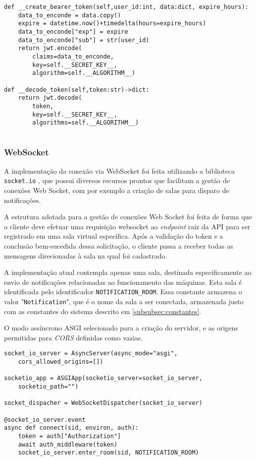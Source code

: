 \begin{verbatim}
def __create_bearer_token(self,user_id:int, data:dict, expire_hours):
    data_to_enconde = data.copy()
    expire = datetime.now()+timedelta(hours=expire_hours)
    data_to_enconde["exp"] = expire
    data_to_enconde["sub"] = str(user_id)
    return jwt.encode(
        claims=data_to_enconde,
        key=self.__SECRET_KEY__,
        algorithm=self.__ALGORITHM__)

def __decode_token(self,token:str)->dict:
    return jwt.decode(
        token,
        key=self.__SECRET_KEY__,
        algorithms=self.__ALGORITHM__)
    
\end{verbatim}

\subsubsection{WebSocket}\label{subsubsec:WebSocketImplement}
A implementação da conexão via WebSocket foi feita utilizando a biblioteca \texttt{socket.io} \cite{socketIoDocs}, que possui diversos recursos prontos que facilitam a gestão de conexões Web Socket, com por exemplo a criação de salas para disparo de notificações.

A estrutura adotada para a gestão de conexões Web Socket foi feita de forma que o cliente deve efetuar uma requisição websocket ao \textit{endpoint} raiz da \gls{API} para ser registrado em uma sala virtual específica. Após a validação do token e a conclusão bem-sucedida dessa solicitação, o cliente passa a receber todas as mensagens direcionadas à sala na qual foi cadastrado.

A implementação atual contempla apenas uma sala, destinada especificamente ao envio de notificações relacionadas ao funcionamento das máquinas. Esta sala é identificada pelo identificador \texttt{NOTIFICATION\_ROOM}. Essa constante armazena o valor "\texttt{Notification}", que é o nome da sala a ser conectada, armazenada justo com as constantes do sistema descrito em \ref{subsubsec:constantes}.

O modo assíncrono \gls{ASGI} selecionado para a criação do servidor, e as origens permitidas para \textit{CORS} definidas como vazias.

\begin{verbatim}
socket_io_server = AsyncServer(async_mode="asgi",
    cors_allowed_origins=[])

socketio_app = ASGIApp(socketio_server=socket_io_server,
    socketio_path="")

socket_dispacher = WebSocketDispatcher(socket_io_server)

@socket_io_server.event
async def connect(sid, environ, auth):
    token = auth["Authorization"]
    await auth_middleware(token)
    socket_io_server.enter_room(sid, NOTIFICATION_ROOM)
\end{verbatim}


